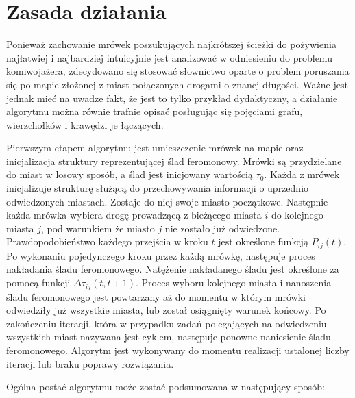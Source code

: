 {    %
    \section{Zasada działania}
    {
        Ponieważ zachowanie mrówek poszukujących najkrótszej ścieżki do pożywienia najłatwiej i najbardziej intuicyjnie
        jest analizować w odniesieniu do problemu komiwojażera, zdecydowano się stosować słownictwo oparte o problem
        poruszania się po mapie złożonej z miast połączonych drogami o znanej długości. Ważne jest jednak mieć na uwadze
        fakt, że jest to tylko przykład dydaktyczny, a działanie algorytmu można równie trafnie opisać posługując się
        pojęciami grafu, wierzchołków i krawędzi je łączących.

        Pierwszym etapem algorytmu jest umieszczenie mrówek na mapie oraz inicjalizacja struktury reprezentującej ślad
        feromonowy. Mrówki są przydzielane do miast w losowy sposób, a ślad jest inicjowany wartością $\tau_0$. Każda z
        mrówek inicjalizuje strukturę służącą do przechowywania informacji o uprzednio odwiedzonych miastach. Zostaje do
        niej swoje miasto początkowe. Następnie każda mrówka wybiera drogę prowadzącą z bieżącego miasta $i$ do
        kolejnego miasta $j$, pod warunkiem że miasto $j$ nie zostało już odwiedzone. Prawdopodobieństwo każdego
        przejścia w kroku $t$ jest określone funkcją $P_{ij}(t)$. Po wykonaniu pojedynczego kroku przez każdą mrówkę,
        następuje proces nakładania śladu feromonowego. Natężenie nakładanego śladu jest określone za pomocą funkcji
        $\Delta\tau_{ij}(t, t+1)$. Proces wyboru kolejnego miasta i nanoszenia śladu feromonowego jest powtarzany aż do
        momentu w którym mrówki odwiedziły już wszystkie miasta, lub został osiągnięty warunek końcowy. Po zakończeniu
        iteracji, która w przypadku zadań polegających na odwiedzeniu wszystkich miast nazywana jest cyklem, następuje
        ponowne naniesienie śladu feromonowego. Algorytm jest wykonywany do momentu realizacji ustalonej liczby iteracji
        lub braku poprawy rozwiązania\cite{Dorigo1991AntSA}.

        Ogólna postać algorytmu może zostać podsumowana w następujący sposób:

}}
